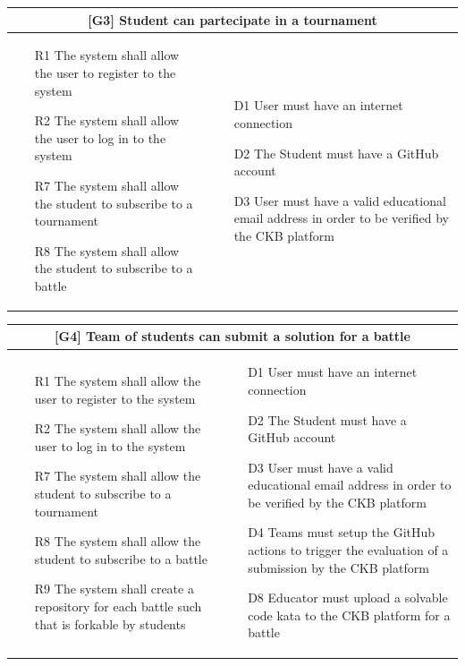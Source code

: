 \begin{tabular}{|p{6cm}|p{6cm}|}
    \hline
    \multicolumn{2}{|c|}{[G3] Student can partecipate in a tournament} \\
    \hline
    \begin{itemize}
        \item [R1] The system shall allow the user to register to the system
        \item [R2] The system shall allow the user to log in to the system
        \item [R7] The system shall allow the student to subscribe to a tournament
        \item [R8] The system shall allow the student to subscribe to a battle
    \end{itemize}
    &
    \begin{itemize}
        \item [D1] User must have an internet connection
        \item [D2] The Student must have a GitHub account
        \item [D3] User must have a valid educational email address in order to be verified by the CKB platform
    \end{itemize}
    \\
    \hline
\end{tabular}

\begin{tabular}{|p{6cm}|p{6cm}|}
    \hline
    \multicolumn{2}{|c|}{[G4] Team of students can submit a solution for a battle} \\
    \hline
    \begin{itemize}
        \item [R1] The system shall allow the user to register to the system
        \item [R2] The system shall allow the user to log in to the system
        \item [R7] The system shall allow the student to subscribe to a tournament
        \item [R8] The system shall allow the student to subscribe to a battle
        \item [R9] The system shall create a repository for each battle such that is forkable by students
    \end{itemize}
    &
    \begin{itemize}
        \item [D1] User must have an internet connection
        \item [D2] The Student must have a GitHub account
        \item [D3] User must have a valid educational email address in order to be verified by the CKB platform
        \item [D4] Teams must setup the GitHub actions to trigger the evaluation of a submission by the CKB platform
        \item [D8] Educator must upload a solvable code kata to the CKB platform for a battle
    \end{itemize}
    \\
    \hline
\end{tabular}

